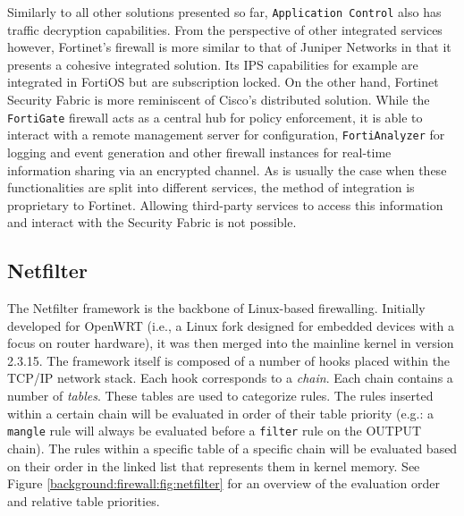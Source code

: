 Similarly to all other solutions presented so far, \texttt{Application Control}
also has traffic decryption capabilities. From the perspective of other integrated
services however, Fortinet's firewall is more similar to that of Juniper Networks
in that it presents a cohesive integrated solution. Its IPS capabilities for
example are integrated in FortiOS but are subscription locked. On the other hand,
Fortinet Security Fabric is more reminiscent of Cisco's distributed solution.
While the \texttt{FortiGate} firewall acts as a central hub for policy enforcement,
it is able to interact with a remote management server for configuration,
\texttt{FortiAnalyzer} for logging and event generation and other firewall
instances for real-time information sharing via an encrypted channel. As is
usually the case when these functionalities are split into different services,
the method of integration is proprietary to Fortinet. Allowing third-party
services to access this information and interact with the Security Fabric is
not possible.

\subsection{Netfilter}

The Netfilter framework is the backbone of Linux-based firewalling. Initially
developed for OpenWRT (i.e., a Linux fork designed for embedded devices with a
focus on router hardware), it was then merged into the mainline kernel in
version 2.3.15. The framework itself is composed of a number of hooks placed
within the TCP/IP network stack. Each hook corresponds to a \textit{chain}.
Each chain contains a number of \textit{tables}. These tables are used to
categorize rules. The rules inserted within a certain chain will be evaluated
in order of their table priority (e.g.: a \texttt{mangle} rule will always be
evaluated before a \texttt{filter} rule on the OUTPUT chain). The rules within
a specific table of a specific chain will be evaluated based on their order
in the linked list that represents them in kernel memory. See Figure
\ref{background:firewall:fig:netfilter} for an overview of the evaluation order
and relative table priorities.

